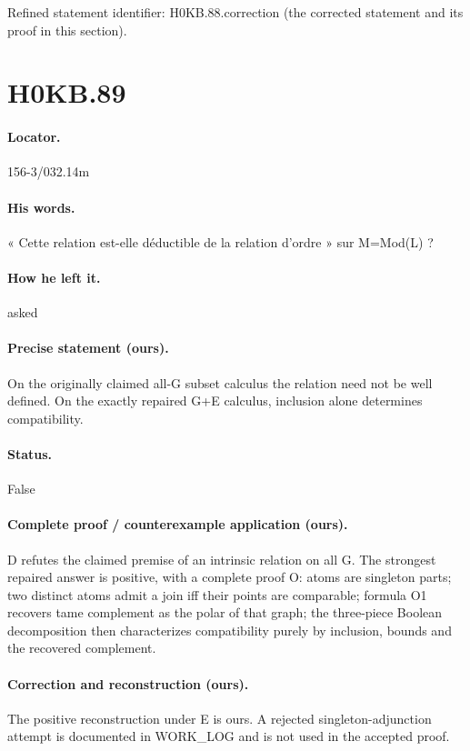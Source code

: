 \noindent Refined statement identifier: H0KB.88.correction (the corrected statement and its proof in this section).

\section*{H0KB.89}\label{statement:H0KB.89}
\paragraph{Locator.} 156-3/032.14m

\paragraph{His words.} « Cette relation est-elle déductible de la relation d’ordre » sur M=Mod(L) ?

\paragraph{How he left it.} asked

\paragraph{Precise statement (ours).} On the originally claimed all-G subset calculus the relation need not be well defined. On the exactly repaired G+E calculus, inclusion alone determines compatibility.

\paragraph{Status.} False

\paragraph{Complete proof / counterexample application (ours).} D refutes the claimed premise of an intrinsic relation on all G. The strongest repaired answer is positive, with a complete proof O: atoms are singleton parts; two distinct atoms admit a join iff their points are comparable; formula O1 recovers tame complement as the polar of that graph; the three-piece Boolean decomposition then characterizes compatibility purely by inclusion, bounds and the recovered complement.

\paragraph{Correction and reconstruction (ours).} The positive reconstruction under E is ours. A rejected singleton-adjunction attempt is documented in WORK\_LOG and is not used in the accepted proof.

